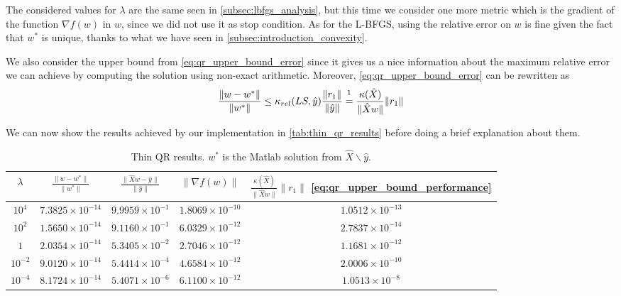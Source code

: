 \noindent The considered values for $\lambda$ are the same seen in \ref{subsec:lbfgs_analysis}, but this time we consider one more metric which is the gradient of the function $\nabla f(w)$ in $w$, since we did not use it as stop condition. As for the L-BFGS, using the relative error on $w$ is fine given the fact that $w^*$ is unique, thanks to what we have seen in \ref{subsec:introduction_convexity}.
\vspace{3mm}

\noindent We also consider the upper bound from \eqref{eq:qr_upper_bound_error} since it gives us a nice information about the maximum relative error we can achieve by computing the solution using non-exact arithmetic. Moreover, \eqref{eq:qr_upper_bound_error} can be rewritten as 
\begin{equation}
    \frac{\lVert w - w^* \lVert}{\lVert w^*\rVert}\leq\kappa_{rel}(LS,\hat{y})\frac{\lVert r_1\rVert}{\lVert \hat{y} \rVert}\stackrel{\footnotemark}{=} \frac{\kappa(\hat{X})}{\lVert \hat{X}w \rVert}\lVert r_1 \rVert
    \label{eq:qr_upper_bound_performance}
\end{equation}

\noindent We can now show the results achieved by our implementation in \autoref{tab:thin_qr_results} before doing a brief explanation about them.
\begin{table}[H]
\centering
\begin{tabular}{c|c|c|c|c} \hline \hline
    $\lambda$ & $\frac{\lVert w - w^* \lVert}{\lVert w^*\rVert}$ & $\frac{\lVert \hat{X}w - \hat{y}\rVert }{\lVert \hat{y} \rVert}$ & $\lVert \nabla f(w) \rVert$ & $\frac{\kappa(\hat{X})}{\lVert \hat{X}w \rVert}\lVert r_1 \rVert$ \eqref{eq:qr_upper_bound_performance} \\ \hline \hline
    
    \rowcolor{gray!30} $10^4$ & $7.3825 \times 10^{-14}$ & $9.9959 \times 10^{-1}$& $1.8069 \times 10^{-10}$ & $1.0512 \times 10^{-13}$ \\
    
    $10^2$ & $1.5650\times 10^{-14}$ & $9.1160 \times 10^{-1}$ & $6.0329 \times 10^{-12}$ & $2.7837\times 10^{-14}$ \\
    
    \rowcolor{gray!30} $1$ & $2.0354 \times 10^{-14}$ & $5.3405 \times 10^{-2}$ & $2.7046 \times 10^{-12}$ & $1.1681\times 10^{-12}$ \\
    
    $10^{-2}$ & $9.0120 \times 10^{-14}$ & $5.4414 \times 10^{-4}$ & $4.6584 \times 10^{-12}$ & $2.0006\times 10^{-10}$ \\
    
    \rowcolor{gray!30} $10^{-4}$ & $8.1724 \times 10^{-14}$ & $5.4071 \times 10^{-6}$ & $6.1100 \times 10^{-12}$ & $1.0513\times 10^{-8}$ \\
    \hline \hline
\end{tabular}
\caption{Thin QR results. $w^{*}$ is the Matlab solution from $\hat{X} \backslash\hat{y}$.}
\label{tab:thin_qr_results}
\end{table}

